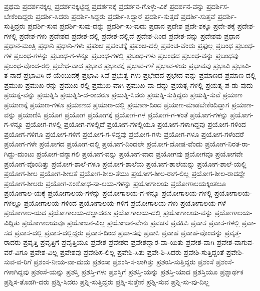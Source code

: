 {ಪ್ರಥಮ
ಪ್ರದರ್ಶನಕ್ಕಲ್ಲ
ಪ್ರದರ್ಶನಕ್ಕಿಟ್ಟಿದ್ದ
ಪ್ರದರ್ಶನಕ್ಕೆ
ಪ್ರದರ್ಶನ-ಗೊಳ್ಳು-ವಿಕೆ
ಪ್ರದರ್ಶನ-ವನ್ನು
ಪ್ರದರ್ಶಿಸ-ಬೇಕೆಂದಿದ್ದರು
ಪ್ರದರ್ಶಿ-ಸಿದರು
ಪ್ರದರ್ಶಿ-ಸಿದ್ದರು
ಪ್ರದರ್ಶಿ-ಸಿದ್ದಾರೆ
ಪ್ರದರ್ಶಿ-ಸುತ್ತದೆ
ಪ್ರದರ್ಶಿ-ಸುತ್ತವೆ
ಪ್ರದರ್ಶಿ-ಸುತ್ತಿದ್ದರು
ಪ್ರದರ್ಶಿ-ಸುವ
ಪ್ರದರ್ಶಿ-ಸುವು-ದನ್ನು
ಪ್ರದರ್ಶಿ-ಸು-ವುದು
ಪ್ರದಾನ
ಪ್ರದೇಶ
ಪ್ರದೇ-ಶಕ್ಕೂ
ಪ್ರದೇ-ಶಕ್ಕೆ
ಪ್ರದೇಶ-ಗಳಲ್ಲಿ
ಪ್ರದೇಶ-ಗಳು
ಪ್ರದೇಶದ
ಪ್ರದೇಶ-ದಲ್ಲಿ
ಪ್ರದೇಶ-ದಲ್ಲಿದೆ
ಪ್ರದೇಶ-ದಿಂದ
ಪ್ರದೇಶ-ವನ್ನು
ಪ್ರದೇಶವು
ಪ್ರಧಾನ
ಪ್ರಧಾನ-ಮಂತ್ರಿ
ಪ್ರಧಾನಿ
ಪ್ರಧಾನಿ-ಗಳು
ಪ್ರಪಂಚ
ಪ್ರಪಂಚಕ್ಕೆ
ಪ್ರಪಂಚ-ದಲ್ಲಿ
ಪ್ರಪಂಚ-ವೆಂದು
ಪ್ರಫುಲ್ಲ
ಪ್ರಬಂಧ
ಪ್ರಬಂಧ-ಗಳ
ಪ್ರಬಂಧ-ಗಳನ್ನು
ಪ್ರಬಂಧ-ಗ-ಳನ್ನೂ
ಪ್ರಬಂಧ-ಗಳಲ್ಲಿ
ಪ್ರಬಂಧ-ಗಳು
ಪ್ರಬಂಧದ
ಪ್ರಬಂಧ-ವನ್ನು
ಪ್ರಬಂಧವು
ಪ್ರಬಂಧ-ವೊಂದ-ರಲ್ಲಿ
ಪ್ರಬೇಧ-ವಾದ
ಪ್ರಭಾವ
ಪ್ರಭಾವಕ್ಕೆ
ಪ್ರಭಾವ-ಗಳೆ
ಪ್ರಭಾವ-ಳಿಯ
ಪ್ರಭಾವವು
ಪ್ರಭಾವಿ
ಪ್ರಭಾವಿ-ತ-ನಾದೆ
ಪ್ರಭಾವಿಸಿ-ದೆ-ಯೆಂಬುದಕ್ಕೆ
ಪ್ರಭಾವಿ-ಸಿವೆ
ಪ್ರಭುತ್ವ-ಗಳು
ಪ್ರಭೇದದ
ಪ್ರಭೇದ-ವನ್ನು
ಪ್ರಮಾಣದ
ಪ್ರಮಾಣ-ದಲ್ಲಿ
ಪ್ರಮುಖ
ಪ್ರಮುಖ-ರನ್ನು
ಪ್ರಮುಖ-ರಲ್ಲಿ
ಪ್ರಮುಖ-ವಾಗಿ
ಪ್ರಮುಖ-ವಾ-ದದ್ದು
ಪ್ರಯತ್ನ-ಗಳಲ್ಲಿ
ಪ್ರಯತ್ನ-ಪ-ಡು-ವುದು
ಪ್ರಯತ್ನ-ವನ್ನು
ಪ್ರಯತ್ನಿಸಿ
ಪ್ರಯತ್ನಿಸಿ-ದ-ರಾದರೂ
ಪ್ರಯತ್ನಿ-ಸಿದರು
ಪ್ರಯತ್ನಿ-ಸುತ್ತಿದ್ದರು
ಪ್ರಯತ್ನಿ-ಸುವೆ
ಪ್ರಯಾಣ
ಪ್ರಯಾಣಕ್ಕೆ
ಪ್ರಯಾಣ-ಗಳೂ
ಪ್ರಯಾಣದ
ಪ್ರಯಾಣ-ದಲ್ಲಿ
ಪ್ರಯಾಣ-ದಿಂದ
ಪ್ರಯಾಣ-ಮಾಡಬೇಕೆಂದಿದ್ದಾಗ
ಪ್ರಯಾಣ-ವನ್ನು
ಪ್ರಯಾಣಿಸಿ
ಪ್ರಯೊಗ
ಪ್ರಯೋಗ
ಪ್ರಯೋಗಕ್ಕೆ
ಪ್ರಯೋಗ-ಗಳ
ಪ್ರಯೋಗ-ಗ-ಳಂತೆ
ಪ್ರಯೋಗ-ಗಳನ್ನು
ಪ್ರಯೋಗ-ಗ-ಳನ್ನೂ
ಪ್ರಯೋಗ-ಗಳಲ್ಲಿ
ಪ್ರಯೋಗ-ಗಳಲ್ಲಿದೆ
ಪ್ರಯೋಗ-ಗಳಲ್ಲಿಯೂ
ಪ್ರಯೋಗ-ಗಳಾಗಿದ್ದವು
ಪ್ರಯೋಗ-ಗಳಿಂದ
ಪ್ರಯೋಗ-ಗಳಿಗೂ
ಪ್ರಯೋಗ-ಗಳಿಗೆ
ಪ್ರಯೋಗ-ಗ-ಳಿದ್ದವು
ಪ್ರಯೋಗ-ಗಳು
ಪ್ರಯೋಗ-ಗಳೂ
ಪ್ರಯೋಗ-ಗಳೆಂದರೆ
ಪ್ರಯೋಗ-ಗಳೇ
ಪ್ರಯೋಗದ
ಪ್ರಯೋಗ-ದಲ್ಲಿ
ಪ್ರಯೋಗ-ದಿಂದಲೇ
ಪ್ರಯೋಗ-ದೋಷ-ವೆಂದು
ಪ್ರಯೋಗ-ನಿರತ-ರಾ-ಗಿದ್ದು-ದುಂಟು
ಪ್ರಯೋಗ-ವನ್ನಾಗಲಿ
ಪ್ರಯೋಗ-ವನ್ನು
ಪ್ರಯೋಗ-ವಾದ
ಪ್ರಯೋಗವು
ಪ್ರಯೋಗವೂ
ಪ್ರಯೋಗವೇ
ಪ್ರಯೋಗ-ವೊಂದಿತ್ತು
ಪ್ರಯೋಗ-ಶಾಲೆ-ಗಳೂ
ಪ್ರಯೋಗ-ಶಾಲೆಯ
ಪ್ರಯೋಗ-ಶಾಲೆಯನ್ನು
ಪ್ರಯೋಗ-ಶಾಲೆ-ಯಲ್ಲಿ
ಪ್ರಯೋಗ-ಶೀಲ
ಪ್ರಯೋಗ-ಶೀಲತೆ
ಪ್ರಯೋಗ-ಶೀಲ-ತೆಯು
ಪ್ರಯೋಗ-ಶೀಲ-ರಾಗ-ಲಿಲ್ಲ
ಪ್ರಯೋಗ-ಶೀಲ-ರಾದದ್ದೇ
ಪ್ರಯೋಗ-ಶೀಲರು
ಪ್ರಯೋಗ-ಸಂಶೋಧ-ನಾ-ಲಯ-ಗಳನ್ನು
ಪ್ರಯೋಗಾಲಯ
ಪ್ರಯೋಗಾಲಯಕ್ಕಿಂತಲೂ
ಪ್ರಯೋಗಾಲ-ಯಕ್ಕೆ
ಪ್ರಯೋಗಾಲಯ-ಗಳನ್ನು
ಪ್ರಯೋಗಾಲಯ-ಗ-ಳನ್ನೂ
ಪ್ರಯೋಗಾಲಯ-ಗಳಲ್ಲಿ
ಪ್ರಯೋಗಾಲಯ-ಗಳಲ್ಲೂ
ಪ್ರಯೋಗಾಲಯ-ಗಳಿಂದ
ಪ್ರಯೋಗಾಲಯ-ಗಳಿಗೆ
ಪ್ರಯೋಗಾಲಯ-ಗಳು
ಪ್ರಯೋಗಾಲಯ-ಗಳೆ
ಪ್ರಯೋಗಾಲ-ಯದ
ಪ್ರಯೋಗಾಲಯ-ದಲ್ಲಾದರೂ
ಪ್ರಯೋಗಾಲಯ-ದಲ್ಲಿ
ಪ್ರಯೋಗಾಲಯ-ವನ್ನು
ಪ್ರಯೋಗಾಲಯ-ವಿದ್ದಿತು
ಪ್ರಯೋಗಾಲಯವೂ
ಪ್ರಯೋಜನ-ವಿಲ್ಲ
ಪ್ರಯೋಜನ-ವೇನು
ಪ್ರವಚನ
ಪ್ರವಹಿಸಿ
ಪ್ರವಾಸ
ಪ್ರವಾಸ-ಗಳಲ್ಲಿ
ಪ್ರವಾ-ಸದ
ಪ್ರವಾಸ-ದಲ್ಲಿ
ಪ್ರವಾಸ-ದಲ್ಲಿದ್ದರು
ಪ್ರವಾಸ-ದಿಂದ
ಪ್ರವಾ-ಸವು
ಪ್ರವಾಸಿ
ಪ್ರವಾಹ
ಪ್ರವಾಹ-ವೊಂದನ್ನು
ಪ್ರವೃತ್ತ-ರಾದರು
ಪ್ರವೃತ್ತಿ
ಪ್ರವೃತ್ತಿಗೆ
ಪ್ರವೃತ್ತಿಯೂ
ಪ್ರವೇಶ
ಪ್ರವೇಶದ
ಪ್ರವೇಶದ್ವಾರ-ವಾ-ಯಿತು
ಪ್ರವೇಶ-ವಾಗಿ
ಪ್ರವೇಶ-ವಾಗುವ-ವರೆ-ವಿಗೂ
ಪ್ರವೇಶ-ವಿಲ್ಲ
ಪ್ರವೇಶವು
ಪ್ರವೇಶಿಸ-ಲಿಲ್ಲ
ಪ್ರವೇಶಿ-ಸಿತು
ಪ್ರವೇ-ಶಿ-ಸಿದರು
ಪ್ರವೇಶಿ-ಸುತ್ತಿದ್ದಂತೆ
ಪ್ರವೇಶಿ-ಸುವ-ವ-ರಿಗೆ
ಪ್ರಶಂಸ-ನೀಯ-ವಾ-ದುದು
ಪ್ರಶಂಸಾ
ಪ್ರಶಂಸಿ-ಸ-ಲಾಗಿತ್ತು
ಪ್ರಶಂಸಿ-ಸುತ್ತಿದ್ದರು
ಪ್ರಶಂಸೆ
ಪ್ರಶಂಸೆ-ಗಳಾಗಿದ್ದವು
ಪ್ರಶಂಸೆ-ಯನ್ನು
ಪ್ರಶಸ್ತಿ
ಪ್ರಶಸ್ತಿ-ಗಳು
ಪ್ರಶಸ್ತಿಗೆ
ಪ್ರಶಸ್ತಿ-ಯನ್ನು
ಪ್ರಶಸ್ತಿ-ಯಾದ
ಪ್ರಶಸ್ತಿಯೂ
ಪ್ರಶ್ನಾರ್ಥಕ
ಪ್ರಶ್ನಿಸ-ತೊಡಗಿ-ದರು
ಪ್ರಶ್ನಿ-ಸಿದರು
ಪ್ರಶ್ನಿ-ಸುತ್ತಿದ್ದರು
ಪ್ರಶ್ನಿ-ಸುತ್ತೇನೆ
ಪ್ರಶ್ನಿ-ಸುವ
ಪ್ರಶ್ನಿ-ಸು-ವು-ದಿಲ್ಲ
}
